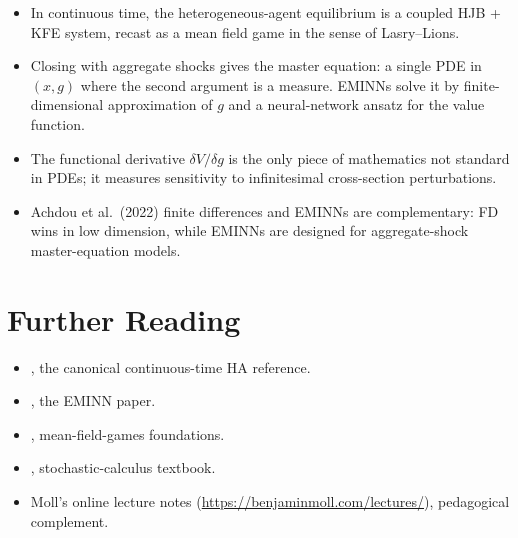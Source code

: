\documentclass[11pt,a4paper]{report}
\begin{document}
\begin{keyinsightbox}
\begin{itemize}[itemsep=2pt, leftmargin=*]
\item In continuous time, the heterogeneous-agent equilibrium is a coupled HJB + KFE system, recast as a mean field game in the sense of Lasry--Lions.
\item Closing with aggregate shocks gives the master equation: a single PDE in $(x, g)$ where the second argument is a measure.  EMINNs solve it by finite-dimensional approximation of $g$ and a neural-network ansatz for the value function.
\item The functional derivative $\delta V/\delta g$ is the only piece of mathematics not standard in PDEs; it measures sensitivity to infinitesimal cross-section perturbations.
\item Achdou et al.\ (2022) finite differences and EMINNs are complementary: FD wins in low dimension, while EMINNs are designed for aggregate-shock master-equation models.
\end{itemize}
\end{keyinsightbox}

\section*{Further Reading}
\begin{itemize}[itemsep=2pt]
\item \citet{achdou2022income}, the canonical continuous-time HA reference.
\item \citet{gu2024masterequations}, the EMINN paper.
\item \citet{lasry2007mean, carmona2018probabilistic, cardaliaguet2019master}, mean-field-games foundations.
\item \citet{shreve2004stochasticii}, stochastic-calculus textbook.
\item Moll's online lecture notes (\url{https://benjaminmoll.com/lectures/}), pedagogical complement.
\end{itemize}
\end{document}
